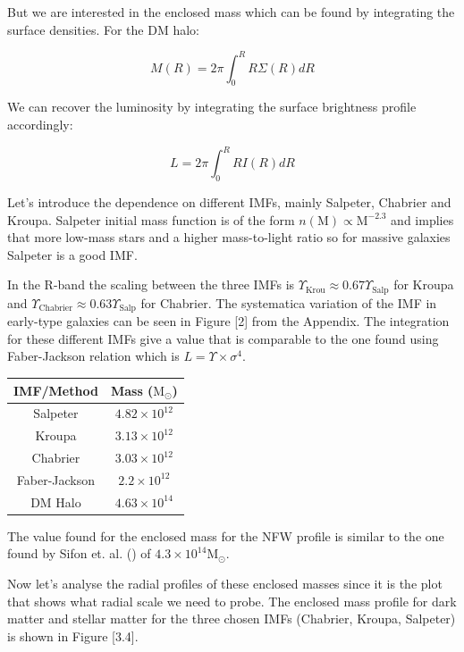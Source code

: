 But we are interested in the enclosed mass which can be found by integrating the surface densities. For the DM halo:

\begin{equation}
M(R)=2\pi \int_{0}^{R} R\Sigma(R)dR
\end{equation}

We can recover the luminosity by integrating the surface brightness profile accordingly:

\begin{equation}
L=2\pi \int_{0}^{R} RI(R)dR
\end{equation}

Let's introduce the dependence on different IMFs, mainly Salpeter, Chabrier and Kroupa. Salpeter initial mass function is of the form $n(\textrm{M})\propto \textrm{M}^{-2.3}$ and implies that more low-mass stars and a higher mass-to-light ratio so for massive galaxies  Salpeter is a good IMF. 

In the R-band the scaling between the three IMFs is $\Upsilon_{\text{Krou}}\approx 0.67\Upsilon_{\text{Salp}}$ for Kroupa and $\Upsilon_{\text{Chabrier}}\approx 0.63\Upsilon_{\text{Salp}}$ for Chabrier. The systematica variation of the IMF in early-type galaxies can be seen in Figure [2] from the Appendix. The integration for these different IMFs give a value that is comparable to the one found using Faber-Jackson relation which is $L=\Upsilon\times\sigma^{4}$. 

\begin{center}
\begin{tabular}{c c}
IMF/Method & Mass ($\text{M}_{\odot}$)\tabularnewline
\hline 
\hline
Salpeter & $4.82\times10^{12}$\tabularnewline
Kroupa & $3.13\times10^{12}$\tabularnewline
Chabrier & $3.03\times10^{12}$\tabularnewline
Faber-Jackson & $2.2\times10^{12}$\tabularnewline
DM Halo & $4.63\times10^{14}$\tabularnewline
\end{tabular}
\end{center}

The value found for the enclosed mass for the NFW profile is similar to the one found by Sifon et. al. (\citeyear{Reference9}) of $4.3\times 10^{14}\text{M}_{\odot}$.

Now let's analyse the radial profiles of these enclosed masses since it is the plot that shows what radial scale we need to probe. The enclosed mass profile for dark matter and stellar matter for the three chosen IMFs (Chabrier, Kroupa, Salpeter) is shown in Figure [3.4].

